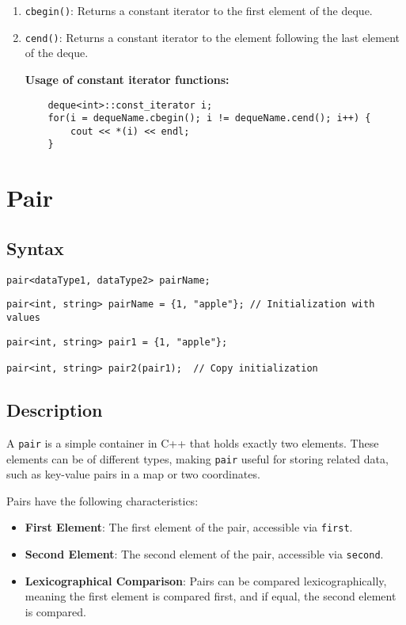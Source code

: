 \documentclass{article}
\begin{document}
\begin{enumerate}
    \item \texttt{cbegin()}: Returns a constant iterator to the first element of the deque.
    \item \texttt{cend()}: Returns a constant iterator to the element following the last element of the deque.
    
    \textbf{Usage of constant iterator functions:}

    \begin{lstlisting}
    deque<int>::const_iterator i;
    for(i = dequeName.cbegin(); i != dequeName.cend(); i++) {
        cout << *(i) << endl;
    }
    \end{lstlisting}

\end{enumerate}

\newpage
\section{Pair}

\subsection{Syntax}

\begin{lstlisting}
pair<dataType1, dataType2> pairName;
\end{lstlisting}

\begin{lstlisting}
pair<int, string> pairName = {1, "apple"}; // Initialization with values
\end{lstlisting}

\begin{lstlisting}
pair<int, string> pair1 = {1, "apple"};

pair<int, string> pair2(pair1);  // Copy initialization
\end{lstlisting}

\subsection{Description}

A \texttt{pair} is a simple container in C++ that holds exactly two elements. These elements can be of different types, making \texttt{pair} useful for storing related data, such as key-value pairs in a map or two coordinates.

\noindent Pairs have the following characteristics:
\begin{itemize}
    \item \textbf{First Element}: The first element of the pair, accessible via \texttt{first}.
    \item \textbf{Second Element}: The second element of the pair, accessible via \texttt{second}.
    \item \textbf{Lexicographical Comparison}: Pairs can be compared lexicographically, meaning the first element is compared first, and if equal, the second element is compared.
\end{itemize}
\end{document}
